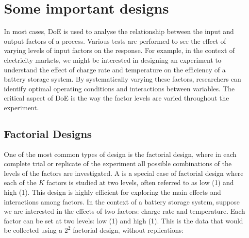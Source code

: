 \documentclass[letterpaper,10pt,english]{jupyterBook}
\begin{document}
\section{Some important designs}
\label{\detokenize{notebooks/design_of_experiments:some-important-designs}}
\sphinxAtStartPar
In most cases, DoE is used to analyse the relationship between the input and output factors of a process. Various tests are performed to see the effect of varying levels of input factors on the response. For example, in the context of electricity markets, we might be interested in designing an experiment to understand the effect of charge rate and temperature on the efficiency of a battery storage system. By systematically varying these factors, researchers can identify optimal operating conditions and interactions between variables. The critical aspect of DoE is the way the factor levels are varied throughout the experiment.


\subsection{Factorial Designs}
\label{\detokenize{notebooks/design_of_experiments:factorial-designs}}
\sphinxAtStartPar
One of the most common types of design is the factorial design, where in each complete trial or replicate of the experiment all possible combinations of the levels of the factors are investigated. A  is a special case of factorial design where each of the \(K\) factors is studied at two levels, often referred to as low (\sphinxhyphen{}1) and high (1). This design is highly efficient for exploring the main effects and interactions among factors. In the context of a battery storage system, suppose we are interested in the effects of two factors: charge rate and temperature. Each factor can be set at two levels: low (\sphinxhyphen{}1) and high (1). This is the data that would be collected using a \(2^2\) factorial design, without replications:
\end{document}
